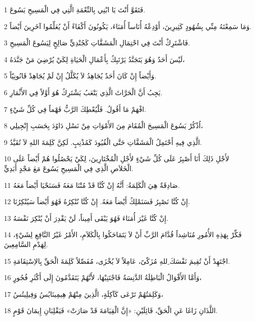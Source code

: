 \par 1 فَتَقَوَّ أَنْتَ يَا ابْنِي بِالنِّعْمَةِ الَّتِي فِي الْمَسِيحِ يَسُوعَ.
\par 2 وَمَا سَمِعْتَهُ مِنِّي بِشُهُودٍ كَثِيرِينَ، أَوْدِعْهُ أُنَاساً أُمَنَاءَ، يَكُونُونَ أَكْفَاءً أَنْ يُعَلِّمُوا آخَرِينَ أَيْضاً.
\par 3 فَاشْتَرِكْ أَنْتَ فِي احْتِمَالِ الْمَشَقَّاتِ كَجُنْدِيٍّ صَالِحٍ لِيَسُوعَ الْمَسِيحِ.
\par 4 لَيْسَ أَحَدٌ وَهُوَ يَتَجَنَّدُ يَرْتَبِكُ بِأَعْمَالِ الْحَيَاةِ لِكَيْ يُرْضِيَ مَنْ جَنَّدَهُ،
\par 5 وَأَيْضاً إِنْ كَانَ أَحَدٌ يُجَاهِدُ لاَ يُكَلَّلُ إِنْ لَمْ يُجَاهِدْ قَانُونِيّاً.
\par 6 يَجِبُ أَنَّ الْحَرَّاثَ الَّذِي يَتْعَبُ يَشْتَرِكُ هُوَ أَوَّلاً فِي الأَثْمَارِ.
\par 7 افْهَمْ مَا أَقُولُ. فَلْيُعْطِكَ الرَّبُّ فَهْماً فِي كُلِّ شَيْءٍ.
\par 8 اُذْكُرْ يَسُوعَ الْمَسِيحَ الْمُقَامَ مِنَ الأَمْوَاتِ مِنْ نَسْلِ دَاوُدَ بِحَسَبِ إِنْجِيلِي،
\par 9 الَّذِي فِيهِ أَحْتَمِلُ الْمَشَقَّاتِ حَتَّى الْقُيُودَ كَمُذْنِبٍ. لَكِنَّ كَلِمَةَ اللهِ لاَ تُقَيَّدُ.
\par 10 لأَجْلِ ذَلِكَ أَنَا أَصْبِرُ عَلَى كُلِّ شَيْءٍ لأَجْلِ الْمُخْتَارِينَ، لِكَيْ يَحْصُلُوا هُمْ أَيْضاً عَلَى الْخَلاَصِ الَّذِي فِي الْمَسِيحِ يَسُوعَ مَعَ مَجْدٍ أَبَدِيٍّ.
\par 11 صَادِقَةٌ هِيَ الْكَلِمَةُ: أَنَّهُ إِنْ كُنَّا قَدْ مُتْنَا مَعَهُ فَسَنَحْيَا أَيْضاً مَعَهُ.
\par 12 إِنْ كُنَّا نَصْبِرُ فَسَنَمْلِكُ أَيْضاً مَعَهُ. إِنْ كُنَّا نُنْكِرُهُ فَهُوَ أَيْضاً سَيُنْكِرُنَا.
\par 13 إِنْ كُنَّا غَيْرَ أُمَنَاءَ فَهُوَ يَبْقَى أَمِيناً، لَنْ يَقْدِرَ أَنْ يُنْكِرَ نَفْسَهُ.
\par 14 فَكِّرْ بِهَذِهِ الأُمُورِ مُنَاشِداً قُدَّامَ الرَّبِّ أَنْ لاَ يَتَمَاحَكُوا بِالْكَلاَمِ، الأَمْرُ غَيْرُ النَّافِعِ لِشَيْءٍ، لِهَدْمِ السَّامِعِينَ.
\par 15 اجْتَهِدْ أَنْ تُقِيمَ نَفْسَكَ ِللهِ مُزَكّىً، عَامِلاً لاَ يُخْزَى، مُفَصِّلاً كَلِمَةَ الْحَقِّ بِالاِسْتِقَامَةِ.
\par 16 وَأَمَّا الأَقْوَالُ الْبَاطِلَةُ الدَّنِسَةُ فَاجْتَنِبْهَا، لأَنَّهُمْ يَتَقَدَّمُونَ إِلَى أَكْثَرِ فُجُورٍ،
\par 17 وَكَلِمَتُهُمْ تَرْعَى كَآكِلَةٍ، الَّذِينَ مِنْهُمْ هِيمِينَايُسُ وَفِيلِيتُسُ،
\par 18 اللَّذَانِ زَاغَا عَنِ الْحَقِّ، قَائِلَيْنِ: «إِنَّ الْقِيَامَةَ قَدْ صَارَتْ» فَيَقْلِبَانِ إِيمَانَ قَوْمٍ.
